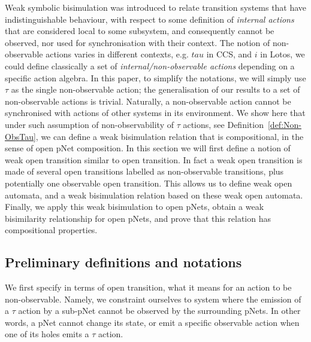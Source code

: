 \documentclass{elsarticle}
\newcommand{\TODO}[1]{\textcolor{red}{\textbf{[TODO:#1]}}}
\begin{document}
Weak symbolic bisimulation was introduced to relate transition systems
that have indistinguishable behaviour, with respect to some definition
of \emph{internal actions} that are considered local to some
subsystem, and consequently cannot be observed, nor used for
synchronisation with their context.
The notion of non-observable actions varies in different contexts,
e.g. $tau$ in CCS, and $i$ in Lotos, we could define classically a set of
\emph{internal/non-observable actions} depending on a specific action
algebra. In this paper, to simplify the notations, we will simply use $\tau$ as the single non-observable action; the generalisation of our results to a set of non-observable actions is trivial. 
Naturally, a non-observable action cannot be synchronised with
actions of other systems in its environment. 
We show here that under such assumption of non-observability of $\tau$ actions, see Definition~\ref{def:Non-ObsTau}, we can define a weak bisimulation relation that is compositional, in the sense of open pNet composition. In this section we will first define a notion of weak open transition similar to open transition. In fact a weak open transition is made of several open transitions labelled as non-observable transitions, plus potentially one observable open transition. This allows us to define weak open automata, and a weak bisimulation relation based on these weak open automata. Finally, we apply this weak bisimulation to open pNets, obtain a weak bisimilarity relationship for open pNets, and prove that this relation has compositional properties.



\subsection{Preliminary definitions and notations}


We first specify in terms of open transition, what it means for an action to be non-observable. Namely, we constraint ourselves to system where the emission of a $\tau$ action by a sub-pNet cannot be observed by the surrounding pNets. In other words, a pNet cannot change its state, or emit a specific observable action when one of its holes emits a $\tau$ action.
\end{document}
